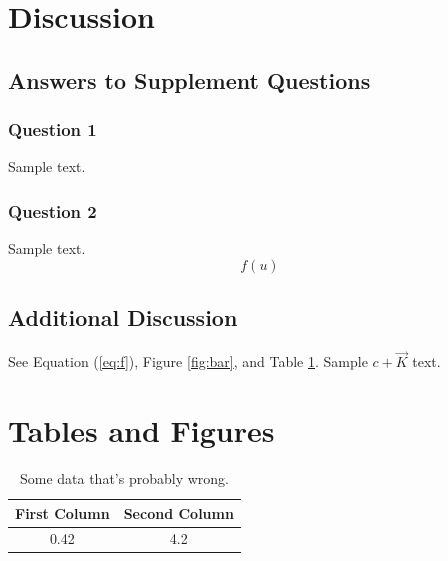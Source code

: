 \documentclass[12pt]{article} %
\begin{document}
\section*{Discussion}
\subsection*{Answers to Supplement Questions}
\subsubsection*{Question 1}
Sample text.
\subsubsection*{Question 2}
Sample text.
\begin{equation}
    \label{eq:f}
    f(u)
\end{equation}
\subsection*{Additional Discussion}
See Equation (\ref{eq:f}), Figure \ref{fig:bar}, and Table \ref{tab:foo}.
Sample $c + \vec{K}$ text.
\section*{Tables and Figures}
\begin{table}[H]
    \centering
    \caption{Some data that's probably wrong.}
    \label{tab:foo}
    \begin{tabular}{ c  c }
        \hline
        \textbf{First Column} & \textbf{Second Column}\\
        \hline
        0.42 & 4.2 \\
        \hline
    \end{tabular}
\end{table}
\end{document}
